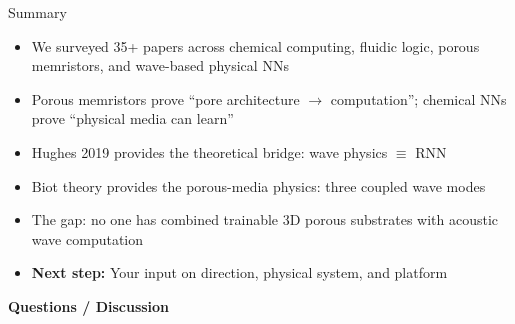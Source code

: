 \documentclass[aspectratio=169,11pt]{beamer}
\begin{document}
\begin{frame}{Summary}
  \begin{itemize}
    \item We surveyed 35+ papers across chemical computing, fluidic logic, porous memristors, and wave-based physical NNs
    \item Porous memristors prove ``pore architecture $\to$ computation''; chemical NNs prove ``physical media can learn''
    \item Hughes 2019 provides the theoretical bridge: wave physics $\equiv$ RNN
    \item Biot theory provides the porous-media physics: three coupled wave modes
    \item The gap: no one has combined trainable 3D porous substrates with acoustic wave computation
    \item \textcolor{gdpDarkBlue}{\textbf{Next step:} Your input on direction, physical system, and platform}
  \end{itemize}

  \vspace{0.4cm}
  \begin{center}
    \Large\textbf{\textcolor{gdpPurple}{Questions / Discussion}}
  \end{center}
\end{frame}
\end{document}
